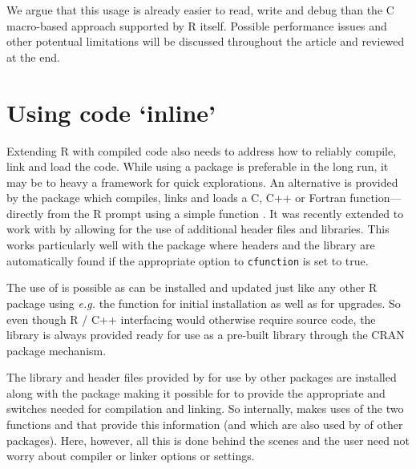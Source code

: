 We argue that this usage is already easier to read, write and debug than the
C macro-based approach supported by R itself. Possible performance issues and
other potentual limitations will be discussed throughout the article and
reviewed at the end.

\section{Using code `inline'}

Extending R with compiled code also needs to address how to reliably compile,
link and load the code.  While using a package is preferable in the long run,
it may be to heavy a framework for quick explorations.  An alternative is
provided by the  package \citep{cran:inline} which compiles,
links and loads a C, C++ or Fortran function---directly from the R prompt
using a simple function .  It was recently extended to work
with  by allowing for the use of additional header files and
libraries. This works particularly well with the  package where
headers and the library are automatically found if the appropriate option
 to \texttt{cfunction} is set to true.

% 
The use of  is possible as  can be installed and
updated just like any other R package using \textsl{e.g.} the
 function for initial installation as well as
 for upgrades.  So even though R / C++ interfacing
would otherwise require source code, the  library is always provided
ready for use as a pre-built library through the CRAN package mechanism.

The library and header files provided by  for use by other packages
are installed along with the  package making it possible for
 to provide the appropriate  and  switches needed
for compilation and linking.  So internally,  makes uses of the
two functions  and  that
provide this information (and which are also used by  of
other packages).  Here, however, all this is done behind the scenes and the
user need not worry about compiler or linker options or settings.

